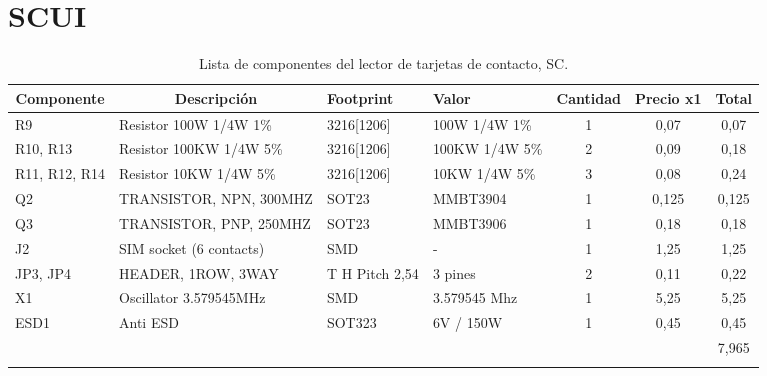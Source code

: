 \newpage
\section{SCUI}
\begin{longtable}{|l|p{2.5cm}|p{2cm}|p{2cm}|c|c|c|}
\hline
\multicolumn{1}{|c|}{\textbf{Componente}} & \multicolumn{1}{c|}{\textbf{Descripción}} & \textbf{ Footprint} & \textbf{Valor} & \textbf{Cantidad} & \textbf{Precio x1} & \textbf{Total} \\ \hline
R9 & Resistor 100W 1/4W 1\%  & 3216[1206] & 100W 1/4W  1\% & 1 & 0,07 & 0,07 \\ \hline
R10, R13 & Resistor 100KW 1/4W 5\%  & 3216[1206] & 100KW 1/4W   5\% & 2 & 0,09 & 0,18 \\ \hline
R11, R12, R14 & Resistor 10KW 1/4W 5\%  & 3216[1206] & 10KW 1/4W   5\% & 3 & 0,08 & 0,24 \\ \hline
Q2 & TRANSISTOR, NPN, 300MHZ & SOT23 & MMBT3904 & 1 & 0,125 & 0,125 \\ \hline
Q3 & TRANSISTOR, PNP, 250MHZ & SOT23 & MMBT3906 & 1 & 0,18 & 0,18 \\ \hline
J2 & SIM socket (6 contacts) & SMD & - & 1 & 1,25 & 1,25 \\ \hline
JP3, JP4 & HEADER, 1ROW, 3WAY & T H Pitch 2,54 & 3 pines & 2 & 0,11 & 0,22 \\ \hline
X1 & Oscillator 3.579545MHz & SMD & 3.579545 Mhz & 1 & 5,25 & 5,25 \\ \hline
ESD1 & Anti ESD & SOT323 & 6V / 150W & 1 & 0,45 & 0,45 \\ \hline
 &  & \multicolumn{1}{l|}{} & \multicolumn{1}{l|}{} & \multicolumn{1}{l|}{} & \multicolumn{1}{l|}{} & 7,965 \\ \hline
\caption{Lista de componentes del lector de tarjetas de contacto, SC.}
\label{}
\end{longtable}

